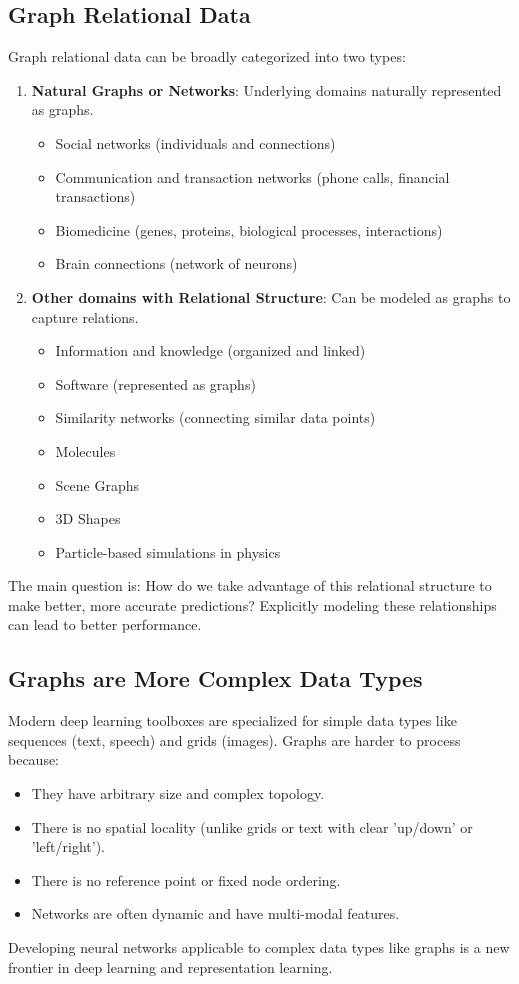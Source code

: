 \documentclass{article}
\begin{document}
\subsection{Graph Relational Data}
Graph relational data can be broadly categorized into two types:
\begin{enumerate}
    \item \textbf{Natural Graphs or Networks}: Underlying domains naturally represented as graphs.
    \begin{itemize}
        \item Social networks (individuals and connections)
        \item Communication and transaction networks (phone calls, financial transactions)
        \item Biomedicine (genes, proteins, biological processes, interactions)
        \item Brain connections (network of neurons)
    \end{itemize}
    \item \textbf{Other domains with Relational Structure}: Can be modeled as graphs to capture relations.
    \begin{itemize}
        \item Information and knowledge (organized and linked)
        \item Software (represented as graphs)
        \item Similarity networks (connecting similar data points)
        \item Molecules
        \item Scene Graphs
        \item 3D Shapes
        \item Particle-based simulations in physics
    \end{itemize}
\end{enumerate}
The main question is: How do we take advantage of this relational structure to make better, more accurate predictions? Explicitly modeling these relationships can lead to better performance.
\subsection{Graphs are More Complex Data Types}
Modern deep learning toolboxes are specialized for simple data types like sequences (text, speech) and grids (images). Graphs are harder to process because:
\begin{itemize}
    \item They have arbitrary size and complex topology.
    \item There is no spatial locality (unlike grids or text with clear 'up/down' or 'left/right').
    \item There is no reference point or fixed node ordering.
    \item Networks are often dynamic and have multi-modal features.
\end{itemize}
Developing neural networks applicable to complex data types like graphs is a new frontier in deep learning and representation learning.
\end{document}
